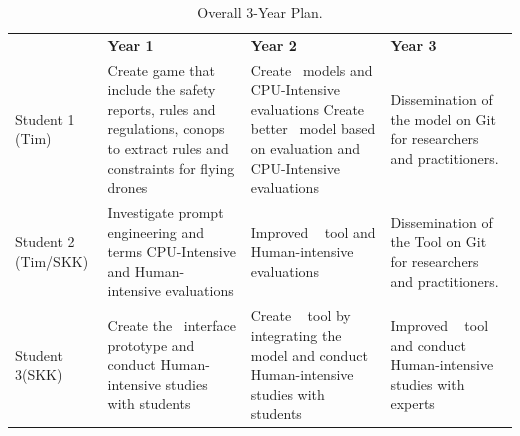 \documentclass[twoside]{NSF}
\newcommand{\IT}{{\sffamily {\em \mbox{ADVICE}}}}
\begin{document}
\begin{table}[!t] 
\caption{Overall 3-Year Plan.}
{\small
\begin{center} 
  \begin{tabular}{|p{1.9cm}|p{4.2cm}|p{4.2cm}|p{4.2cm}|}\hline  
        \textbf{}&\textbf{Year 1}&\textbf{Year 2}&\textbf{Year 3}\\
\rowcolor{blue!10}
Student 1 (Tim)&
Create game that include the safety reports, rules and regulations, conops to  extract rules and constraints for flying drones
&
Create \IT~models and CPU-Intensive evaluations
Create better \IT~model based on evaluation and CPU-Intensive evaluations&
Dissemination of the model on Git for researchers and practitioners.\\
 

Student 2
(Tim/SKK)&
Investigate prompt engineering and terms
CPU-Intensive and Human-intensive evaluations 
&
Improved  \IT~ tool and 
Human-intensive evaluations 
&
Dissemination of the Tool on Git for researchers and practitioners.\\
 

\rowcolor{blue!10}
Student 3(SKK)&
Create the \IT~interface prototype and conduct Human-intensive studies with students &
Create \IT~ tool by integrating the model and conduct Human-intensive studies with students 
 &
Improved  \IT~ tool and conduct Human-intensive studies with experts\\
\hline

         \end{tabular}
  \label{DGcreativity}
  \vspace*{-18pt}
\end{center}}
\end{table}








   


\end{document}
